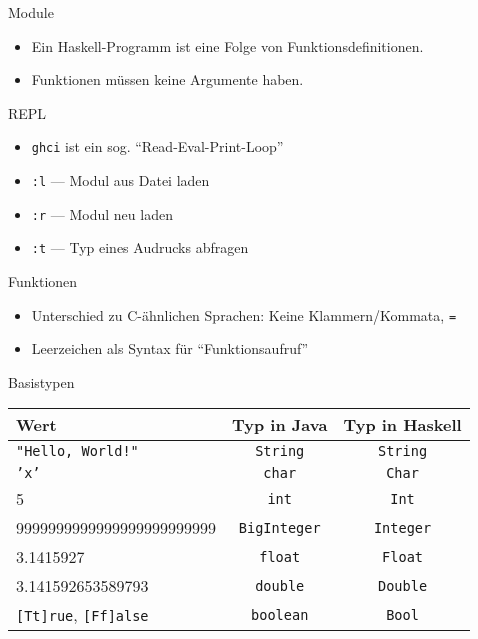 \documentclass{beamer}
\begin{document}
\begin{frame}{Module}

        \begin{itemize}
                \item Ein Haskell-Programm ist eine Folge von Funktionsdefinitionen.
                \item Funktionen müssen keine Argumente haben.
        \end{itemize}
\end{frame}

\begin{frame}{REPL}

        \begin{itemize}
                \item \texttt{ghci} ist ein sog. \enquote{Read-Eval-Print-Loop}
                \item \texttt{:l} --- Modul aus Datei laden
                \item \texttt{:r} --- Modul neu laden
                \item \texttt{:t} --- Typ eines Audrucks abfragen
        \end{itemize}
\end{frame}

\begin{frame}{Funktionen}

        \begin{itemize}
                \item Unterschied zu C-ähnlichen Sprachen: Keine Klammern/Kommata, \texttt{=}
                \item Leerzeichen als Syntax für \enquote{Funktionsaufruf}
        \end{itemize}
\end{frame}

\begin{frame}{Basistypen}
        \begin{tabular}{ l | c | c }
                Wert & Typ in Java & Typ in Haskell \\
                \hline
                \texttt{"Hello, World!"} & \texttt{String} & \pause \texttt{String} \\
                \texttt{'x'} & \texttt{char} & \pause \texttt{Char} \\
                5 & \texttt{int} & \pause \texttt{Int} \\
                9999999999999999999999999 & \texttt{BigInteger} & \pause \texttt{Integer} \\
                3.1415927 & \texttt{float} & \pause \texttt{Float} \\
                3.141592653589793 & \texttt{double} & \pause \texttt{Double} \\
                \texttt{[Tt]rue}, \texttt{[Ff]alse} & \texttt{boolean} & \pause \texttt{Bool} \\
        \end{tabular}
\end{frame}
\end{document}
